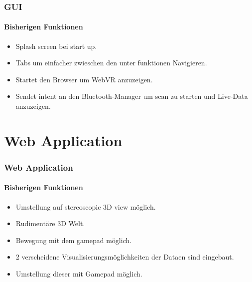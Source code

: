\documentclass{beamer}
\begin{document}
\begin{frame}
\frametitle{GUI}
\framesubtitle{Bisherigen Funktionen}
\begin{itemize}
  \item Splash screen bei start up.
  \item Tabs um einfacher zwieschen den unter funktionen Navigieren.
  \item Startet den Browser um WebVR anzuzeigen.
  \item Sendet intent an den Bluetooth-Manager um scan zu starten und Live-Data anzuzeigen.
\end{itemize}
\end{frame}

\section{Web Application}

\begin{frame}
\frametitle{Web Application}
\framesubtitle{Bisherigen Funktionen}
\begin{itemize}
  \item Umstellung auf stereoscopic 3D view m\"oglich.
  \item Rudiment\"are 3D Welt.
  \item Bewegung mit dem gamepad m\"oglich.
  \item 2 verscheidene Visualisierungsmöglichkeiten der Dataen sind eingebaut.
  \item Umstellung dieser mit Gamepad m\"oglich.
\end{itemize}
\end{frame}
\end{document}
